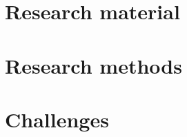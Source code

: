\documentclass[12pt,a4paper,english,oneside]{article}
\begin{document}


\section{Research material}



\section{Research methods}





\section{Challenges}

\end{document}
